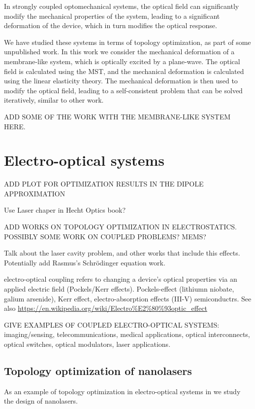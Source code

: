 In strongly coupled optomechanical systems, the optical field can significantly modify the mechanical properties of the system, leading to a significant deformation
of the device, which in turn modifies the optical response. 

We have studied these systems in terms of topology optimization, as part of some unpublished work. In this work we consider 
the mechanical deformation of a membrane-like system, which is optically excited by a plane-wave. The optical field is calculated using the MST,
and the mechanical deformation is calculated using the linear elasticity theory. The mechanical deformation is then used to modify the optical field, 
leading to a self-consistent problem that can be solved iteratively, similar to other work.

ADD SOME OF THE WORK WITH THE MEMBRANE-LIKE SYSTEM HERE.


\section{Electro-optical systems~\cite{ownpub4}}

ADD PLOT FOR OPTIMIZATION RESULTS IN THE DIPOLE APPROXIMATION

Use Laser chaper in Hecht Optics book?



ADD WORKS ON TOPOLOGY OPTIMIZATION IN ELECTROSTATICS. POSSIBLY SOME WORK
ON COUPLED PROBLEMS? MEMS?

Talk about the laser cavity problem, and other works that include this effects.
Potentially add Rasmus's Schrödinger equation work.

electro-optical coupling refers to changing a device’s optical properties via an applied electric field (Pockels/Kerr effects). Pockels-effect (lithiumn niobate, galium arsenide), Kerr effect, electro-absorption effects (III-V) semiconductrs.
See also \url{https://en.wikipedia.org/wiki/Electro%E2%80%93optic_effect}

GIVE EXAMPLES OF COUPLED ELECTRO-OPTICAL SYSTEMS: imaging/sensing, telecommunications,
medical applications, optical interconnects, optical switches, optical modulators,
laser applications.

\subsection*{Topology optimization of nanolasers \cite{ownpub4}}

As an example of topology optimization in electro-optical systems in \cite{ownpub4} we study the design of nanolasers. 
